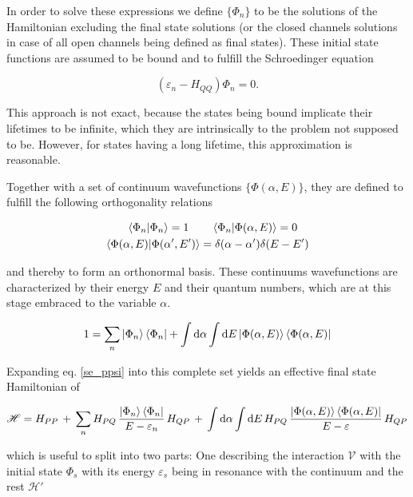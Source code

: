 In order to solve these expressions we define $\{\Phi_n\}$ to be the solutions
of the Hamiltonian excluding the final state solutions (or the closed channels
solutions in case of all open channels being defined as final states).
These initial state functions are assumed to be bound and to fulfill the
Schroedinger equation

\begin{equation}
  (\varepsilon_n - H_{QQ}) \Phi_n = 0 .
\end{equation}

This approach is not exact, because the states being bound implicate
their lifetimes to be infinite, which they are intrinsically
to the problem not supposed to be. However, for states having a long lifetime,
this approximation is reasonable.

Together with a set of continuum wavefunctions $\{\Phi(\alpha,E)\}$, they are
defined to fulfill the following orthogonality relations

\begin{align}
  \braket{\Phi_n|\Phi_n} = 1 \quad  & \quad \braket{\Phi_n|\Phi(\alpha,E)} = 0\\
  \braket{\Phi(\alpha,E)|\Phi(\alpha',E')} & = \delta(\alpha-\alpha') \delta(E-E')
\end{align}

and thereby to form an orthonormal basis. These continuums wavefunctions
are characterized
by their energy $E$ and their quantum numbers, which are at this stage embraced
to the variable $\alpha$.

\begin{equation}
  1 = \sum\limits_n \ket{\Phi_n}\bra{\Phi_n} + \int \mathrm{d}\alpha \int \mathrm{d}E
      \ket{\Phi(\alpha,E)}\bra{\Phi(\alpha,E)} \label{feshbach_1}
\end{equation}

Expanding eq. \ref{se_ppsi} into this complete set yields an effective
final state Hamiltonian of

\begin{equation}
  \mathscr{H} = H_{PP}\, + \,
  \sum\limits_n H_{PQ} \,\frac{\ket{\Phi_n}\bra{\Phi_n}}{E-\varepsilon_n}\, H_{QP} \,+\,
  \int \mathrm{d}\alpha \int\mathrm{d}E \,H_{PQ} \,
  \frac{\ket{\Phi(\alpha,E)}\bra{\Phi(\alpha,E)}}{E-\varepsilon} \, H_{QP}
\end{equation}

which is useful to split into two parts: One describing the interaction
$\mathcal{V}$ with the
initial state $\Phi_s$ with its energy $\varepsilon_s$ being in resonance with
the continuum and the rest $\mathscr{H}'$

